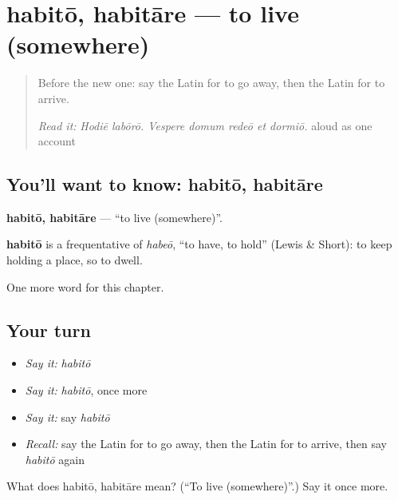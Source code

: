 \section[habitō, habitāre]{habitō, habitāre — to live (somewhere)}

\label{lesson:LA-C160-habito}



\begin{quote}
Before the new one: say the Latin for to go away, then the Latin for to arrive.

\emph{Read it:} \emph{Hodiē labōrō. Vespere domum redeō et dormiō.} aloud as one account
\end{quote}

\subsection*{You'll want to know: habitō, habitāre}
\textbf{habitō, habitāre} — \textquotedblleft{}to live (somewhere)\textquotedblright{}.

\begin{cousinweb}
\textbf{habitō} is a frequentative of \emph{habeō}, \textquotedblleft{}to have, to hold\textquotedblright{} (Lewis \& Short): to keep holding a place, so to dwell.
\end{cousinweb}

\begin{grammarlens}[title={What you've built}]
One more word for this chapter.
\end{grammarlens}

\subsection*{Your turn}
\begin{itemize}
\raggedright
  \item \emph{Say it:} \emph{habitō}
  \item \emph{Say it:} \emph{habitō}, once more
  \item \emph{Say it:} say \emph{habitō}
  \item \emph{Recall:} say the Latin for to go away, then the Latin for to arrive, then say \emph{habitō} again
\end{itemize}

\begin{tcolorbox}[breakable,colback=teal!4,colframe=teal!35!black,title={Before you move on}]
What does habitō, habitāre mean? (\textquotedblleft{}To live (somewhere)\textquotedblright{}.) Say it once more.
\end{tcolorbox}
